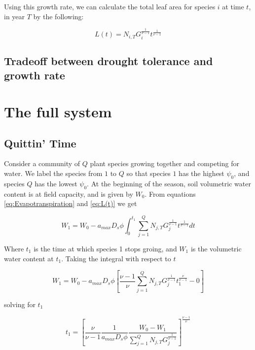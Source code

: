 \documentclass{article}
\begin{document}
  Using this growth rate, we can calculate the total leaf area for species $i$ at
  time $t$, in year $T$ by the following:

  \begin{equation} \label{eq:L(t)}
    L(t) = N_{i, T}G_{i}^{\frac{1}{\nu - 1}}t^{\frac{1}{\nu - 1}}
  \end{equation}

  \subsection{Tradeoff between drought tolerance and growth rate} \label{G tradeoffs}




  \section{The full system}

  \subsection{Quittin' Time}

  Consider a community of $Q$ plant species growing together and competing for
  water. We label the species from $1$ to $Q$ so that species $1$ has the
  highest $\psi_{0}$, and species $Q$ has the lowest $\psi_{0}$. At the
  beginning of the season, soil volumetric water content is at field capacity,
  and is given by $W_{0}$. From equations \ref{eq:Evapotranspiration} and
  \ref{eq:L(t)} we get

  $$ W_{1} =  W_{0} - a_{max}D_{s}\phi \int_{0}^{t_{1}} \! \sum_{j = 1}^{Q}N_{j, T}G_{j}^{\frac{1}{\nu-1}}t^{\frac{1}{\nu-1}}dt$$

 Where $t_{1}$ is the time at which species 1 stops groing, and $W_{1}$ is the
 volumetric water content at $t_{1}$. Taking the integral with respect to $t$

  $$ W_{1} =  W_{0} - a_{max}D_{s}\phi \left[ \frac{\nu - 1}{\nu}\sum_{j = 1}^{Q}N_{j, T}G_{j}^{\frac{1}{\nu-1}}t_{1}^{\frac{\nu}{\nu-1}}  - 0\right] $$

  solving for $t_{1}$

  \begin{equation} \label{eq:t1}
    t_{1} = \left[ \frac{\nu}{\nu-1} \frac{1}{a_{max}D_{s}\phi} \frac{W_{0} - W_{1}}{\sum_{j=1}^{Q}N_{j, T}G_{j}^{\frac{1}{\nu - 1}}} \right]^{\frac{\nu - 1}{\nu}}
  \end{equation}
\end{document}

